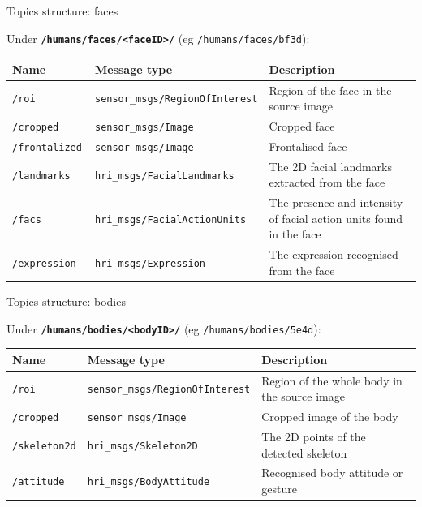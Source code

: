 \documentclass[xcolor=table]{beamer}
\begin{document}
\begin{frame}{Topics structure: faces}

    Under \textbf{\texttt{/humans/faces/<faceID>/}} (eg \texttt{/humans/faces/bf3d}):

    \scriptsize
    \begin{tabular}{@{}llp{4cm}@{}}
        \toprule
\textbf{Name} & \textbf{Message type}         & \textbf{Description}                                                \\ \midrule
        \texttt{/roi       }   & \texttt{sensor\_msgs/RegionOfInterest} & Region of the face in the source image                              \\
        \texttt{/cropped       }   & \texttt{sensor\_msgs/Image} & Cropped face                              \\
        \texttt{/frontalized       }   & \texttt{sensor\_msgs/Image} & Frontalised face                              \\
        \texttt{/landmarks }   & \texttt{hri\_msgs/FacialLandmarks    } & The 2D facial landmarks extracted from the face                     \\
        \texttt{/facs      }   & \texttt{hri\_msgs/FacialActionUnits  } & The presence and intensity of facial action units found in the face \\
        \texttt{/expression}   & \texttt{hri\_msgs/Expression         } & The expression recognised from the face           \\  \bottomrule               
\end{tabular}
    
\end{frame}

\begin{frame}{Topics structure: bodies}

    Under \textbf{\texttt{/humans/bodies/<bodyID>/}} (eg \texttt{/humans/bodies/5e4d}):

    \scriptsize
    \begin{tabular}{@{}llp{4cm}@{}}
        \toprule
        \textbf{Name} & \textbf{Message type}         & \textbf{Description}                                                \\ \midrule
        \texttt{/roi       }   & \texttt{sensor\_msgs/RegionOfInterest} & Region of the whole body in the source image                              \\
        \texttt{/cropped       }   & \texttt{sensor\_msgs/Image} & Cropped image of the body                              \\
        \texttt{/skeleton2d}   & \texttt{hri\_msgs/Skeleton2D}        & The 2D points of the detected skeleton                              \\
        \texttt{/attitude}    & \texttt{hri\_msgs/BodyAttitude}      & Recognised body attitude or gesture                                 \\
        \bottomrule               
\end{tabular}
    
\end{frame}
\end{document}
